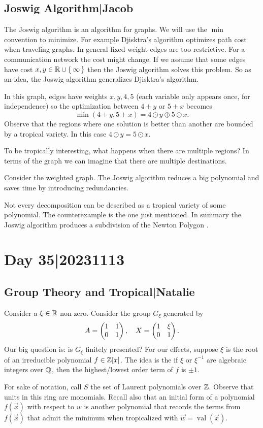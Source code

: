 \documentclass[12pt]{memoir}
\DeclareMathOperator{\val}{val}
\begin{document}
\subsection{Joswig Algorithm|Jacob}

The Joswig algorithm is an algorithm for graphs. We will use the $\min$ convention to minimize. For example Djisktra's algorithm optimizes path cost when traveling graphs. In general fixed weight edges are too restrictive. For a communication network the cost might change. If we assume that some edges have cost $x,y\in\mathbb{R}\cup\{\,\infty\,\}$ then the Joswig algorithm solves this problem. So as an idea, the Joswig algorithm generalizes Djisktra's algorithm.
\begin{Ex}
    In this graph, edges have weights $x,y,4,5$ (each variable only appears once, for independence) so the optimization between $4+y$ or $5+x$ becomes 
    $$\min(4+y,5+x)=4\odot y\oplus5\odot x.$$
    Observe that the regions where one solution is better than another are bounded by a tropical variety. In this case $4\odot y=5\odot x$.
\end{Ex}

To be tropically interesting, what happens when there are multiple regions? In terms of the graph we can imagine that there are multiple destinations.

\begin{Ex}
    Consider the weighted graph. The Joswig algorithm reduces a big polynomial and saves time by introducing redundancies.
\end{Ex}

Not every decomposition can be described as a tropical variety of some polynomial. The counterexample is the one just mentioned. In summary the Joswig algorithm produces a subdivision of the Newton Polygon .

\section{Day 35|20231113}
\subsection{Group Theory and Tropical|Natalie}

Consider a $\xi\in\mathbb{R}$ non-zero. Consider the group $G_\xi$ generated by 
$$A=\begin{pmatrix} 1 & 1 \\ 0 & 1 \end{pmatrix},\quad X=\begin{pmatrix} 1 & \xi \\ 0 & 1 \end{pmatrix}.$$
Our big question is: is $G_\xi$ finitely presented? For our effects, suppose $\xi$ is the root of an irreducible polynomial $f\in\mathbb{Z}[x]$. The idea is the if $\xi$ or $\xi^{-1}$ are algebraic integers over $\mathbb{Q}$, then the highest/lowest order term of $f$ is $\pm1$.\par 
For sake of notation, call $S$ the set of Laurent polynomials over $\mathbb{Z}$. Observe that units in this ring are monomials. Recall also that an initial form of a polynomial $f(\vec x)$ with respect to $w$ is another polynomial that records the terms from $f(\vec x)$ that admit the minimum when tropicalized with $\vec w=\val(\vec x)$.
\end{document}
